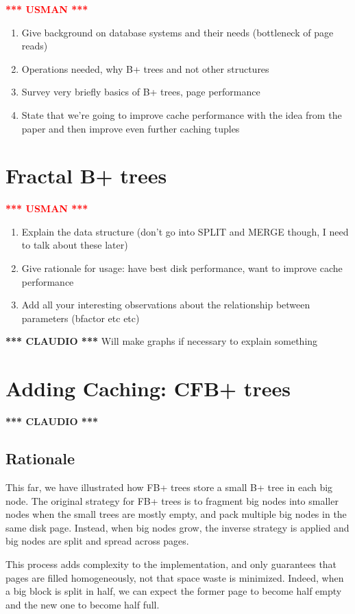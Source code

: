 \documentclass{article}
\newcommand{\usman}{\textcolor{Red}{\textbf{*** USMAN ***} }}
\newcommand{\claudio}{\textcolor{Cerulean}{\textbf{*** CLAUDIO ***} }}
\begin{document}
\usman
\begin{enumerate}
	\item Give background on database systems and their needs (bottleneck of page reads)
	\item Operations needed, why B+ trees and not other structures
	\item Survey very briefly basics of B+ trees, page performance
	\item State that we're going to improve cache performance with the idea from the paper and then improve even further
caching tuples
\end{enumerate}



\section{Fractal B+ trees}
\usman
\begin{enumerate}
	\item Explain the data structure (don't go into SPLIT and MERGE though, I need to talk about these later)
	\item Give rationale for usage: have best disk performance, want to improve cache performance
	\item Add all your interesting observations about the relationship between parameters (bfactor etc etc)
\end{enumerate}
\claudio
Will make graphs if necessary to explain something

\section{Adding Caching: CFB+ trees}
\claudio
\subsection{Rationale}
This far, we have illustrated how FB+ trees store a small B+ tree in each big node.
The original strategy for FB+ trees is to fragment big nodes into smaller nodes when the small trees
are mostly empty, and pack multiple big nodes in the same disk page.
Instead, when big nodes grow, the inverse strategy is applied and big nodes are split and spread
across pages.

This process adds complexity to the implementation, and only guarantees that pages are filled
homogeneously, not that space waste is minimized.
Indeed, when a big block is split in half, we can expect the former page to become half empty and
the new one to become half full.
\end{document}
